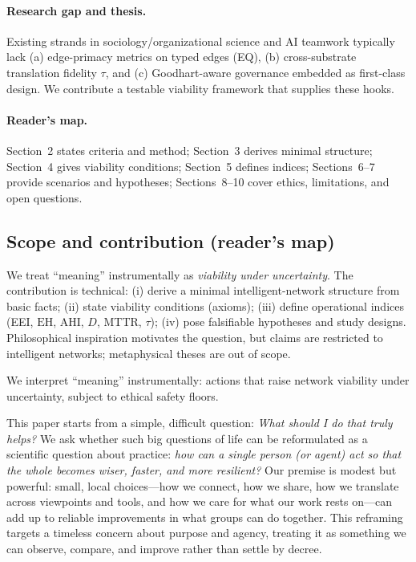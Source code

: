 \documentclass[12pt]{article}
\newcommand{\EH}{\ensuremath{\mathrm{EH}}}
\newcommand{\AHI}{\ensuremath{\mathrm{AHI}}}
\begin{document}
\paragraph{Research gap and thesis.}
Existing strands in sociology/organizational science and AI teamwork typically lack (a) edge-primacy metrics on typed edges (EQ), (b) cross-substrate translation fidelity $\tau$, and (c) Goodhart-aware governance embedded as first-class design. We contribute a testable viability framework that supplies these hooks.

\paragraph{Reader's map.}
Section~2 states criteria and method; Section~3 derives minimal structure; Section~4 gives viability conditions; Section~5 defines indices; Sections~6–7 provide scenarios and hypotheses; Sections~8–10 cover ethics, limitations, and open questions.

\subsection*{Scope and contribution (reader's map)}
We treat ``meaning'' instrumentally as \emph{viability under uncertainty}. The contribution is technical: (i) derive a minimal intelligent-network structure from basic facts; (ii) state viability conditions (axioms); (iii) define operational indices (EEI, $\EH$, \AHI, $D$, MTTR, $\tau$); (iv) pose falsifiable hypotheses and study designs. Philosophical inspiration motivates the question, but claims are restricted to intelligent networks; metaphysical theses are out of scope.

We interpret ``meaning'' instrumentally: actions that raise network viability under uncertainty, subject to ethical safety floors.

This paper starts from a simple, difficult question: \emph{What should I do that truly helps?} We ask whether such big questions of life can be reformulated as a scientific question about practice: \emph{how can a single person (or agent) act so that the whole becomes wiser, faster, and more resilient?} Our premise is modest but powerful: small, local choices—how we connect, how we share, how we translate across viewpoints and tools, and how we care for what our work rests on—can add up to reliable improvements in what groups can do together. This reframing targets a timeless concern about purpose and agency, treating it as something we can observe, compare, and improve rather than settle by decree.
\end{document}
